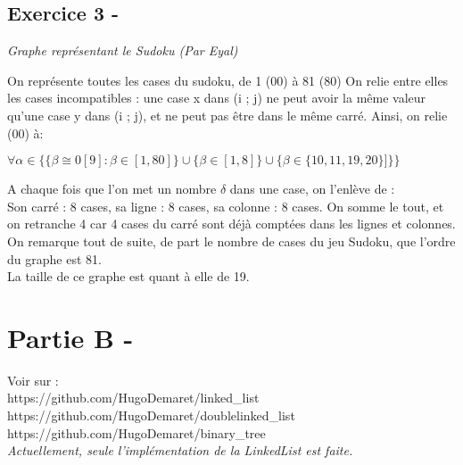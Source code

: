 \documentclass{article}
\begin{document}
\subsection*{Exercice 3 -}
\textit{Graphe représentant le Sudoku (Par Eyal)}
\begin{center}
\end{center}
\textsf{On représente toutes les cases du sudoku, de 1 (00) à 81 (80)}
\textsf{On relie entre elles les cases incompatibles : une case x dans (i ; j) ne peut avoir la même valeur qu'une case y dans (i ; j), et ne peut pas être dans le même carré.}
\textsf{Ainsi, on relie (00) à:}
\begin{center}
	$
		\forall \alpha \in \{\{\beta \cong 0 [9] : \beta \in [1,80] \}\cup \{\beta \in [1,8]\} \cup \{\beta \in \{10,11,19,20\}]\}\}
	$
\end{center}
\textsf{A chaque fois que l'on met un nombre $\delta$ dans une case, on l'enlève de :}\\
\textsf{Son carré : 8 cases, sa ligne : 8 cases, sa colonne : 8 cases.}
\textsf{On somme le tout, et on retranche 4 car 4 cases du carré sont déjà comptées dans les lignes et colonnes.}
\textsf{On remarque tout de suite, de part le nombre de cases du jeu Sudoku, que l'ordre du graphe est 81.}\\
\textsf{La taille de ce graphe est quant à elle de 19.}
\section*{Partie B -}
Voir sur :\\
	https://github.com/HugoDemaret/linked\_list\\
	https://github.com/HugoDemaret/doublelinked\_list\\
	https://github.com/HugoDemaret/binary\_tree\\
	\textit{Actuellement, seule l'implémentation de la LinkedList est faite.}
\end{document}

